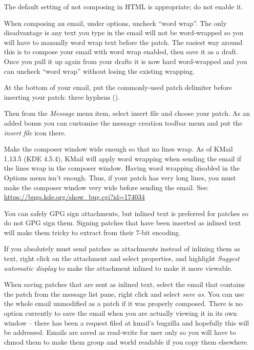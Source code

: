 \documentclass[a4paper,8pt,english]{sphinxmanual}
\begin{document}
The default setting of not composing in HTML is appropriate; do not
enable it.

When composing an email, under options, uncheck ``word wrap''. The only
disadvantage is any text you type in the email will not be word-wrapped
so you will have to manually word wrap text before the patch. The easiest
way around this is to compose your email with word wrap enabled, then save
it as a draft. Once you pull it up again from your drafts it is now hard
word-wrapped and you can uncheck ``word wrap'' without losing the existing
wrapping.

At the bottom of your email, put the commonly-used patch delimiter before
inserting your patch:  three hyphens (\code{-{-}-}).

Then from the \emph{Message} menu item, select insert file and
choose your patch.
As an added bonus you can customise the message creation toolbar menu
and put the \emph{insert file} icon there.

Make the composer window wide enough so that no lines wrap. As of
KMail 1.13.5 (KDE 4.5.4), KMail will apply word wrapping when sending
the email if the lines wrap in the composer window. Having word wrapping
disabled in the Options menu isn't enough. Thus, if your patch has very
long lines, you must make the composer window very wide before sending
the email. See: \href{https://bugs.kde.org/show\_bug.cgi?id=174034}{https://bugs.kde.org/show\_bug.cgi?id=174034}

You can safely GPG sign attachments, but inlined text is preferred for
patches so do not GPG sign them.  Signing patches that have been inserted
as inlined text will make them tricky to extract from their 7-bit encoding.

If you absolutely must send patches as attachments instead of inlining
them as text, right click on the attachment and select properties, and
highlight \emph{Suggest automatic display} to make the attachment
inlined to make it more viewable.

When saving patches that are sent as inlined text, select the email that
contains the patch from the message list pane, right click and select
\emph{save as}.  You can use the whole email unmodified as a patch
if it was properly composed.  There is no option currently to save the email
when you are actually viewing it in its own window -- there has been a request
filed at kmail's bugzilla and hopefully this will be addressed.  Emails are
saved as read-write for user only so you will have to chmod them to make them
group and world readable if you copy them elsewhere.
\end{document}
